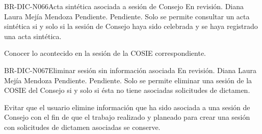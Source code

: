 \begin{BusinessRule}{BR-DIC-N066}{Acta sintética asociada a sesión de Consejo}
	{\bcCondition} %
	{\btEnabler}     %
	{\blControlling}     %
	\BRItem[Estado] En revisión.
	 Diana Laura Mejía Mendoza
	 Pendiente.
	 Pendiente. 
	\BRItem[Descripción] Solo se permite consultar un acta sintética si y solo si la sesión de Consejo haya sido celebrada y se haya registrado una acta sintética.
	
	\BRItem[Motivación] Conocer lo acontecido en la sesión de la COSIE correspondiente.
\end{BusinessRule}


\begin{BusinessRule}{BR-DIC-N067}{Eliminar sesión sin información asociada}
	{\bcCondition} %
	{\btTimer}     %
	{\blControlling}     %
	\BRItem[Estado] En revisión.
	 Diana Laura Mejía Mendoza
	 Pendiente.
	 Pendiente.
	\BRItem[Descripción] Solo se permite eliminar una sesión de la COSIE del Consejo si y solo si ésta no tiene asociadas solicitudes de dictamen.
	\BRItem[Sentencia] \cdtEmpty
	
	\BRItem[Motivación] Evitar que el usuario elimine información que ha sido asociada a una sesión de Consejo con el fin de que el trabajo realizado y planeado para crear una sesión con solicitudes de dictamen asociadas se conserve.
\end{BusinessRule}


